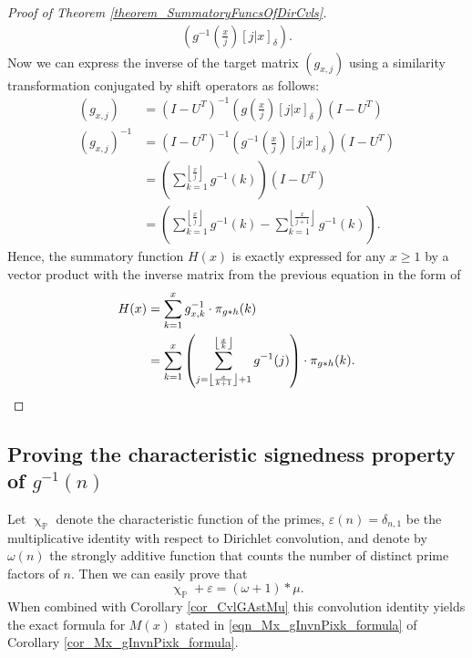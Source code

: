 \documentclass[11pt,reqno,a4letter]{article}
\numberwithin{figure}{section}
\numberwithin{table}{section}
\newcommand{\Iverson}[1]{\ensuremath{\left[#1\right]_{\delta}}}
\newcommand{\floor}[1]{\left\lfloor #1 \right\rfloor}
\renewcommand{\chi}{\upchi}
\theoremstyle{plain}
\numberwithin{theorem}{section}
\theoremstyle{definition}
\begin{document}
\begin{proof}[Proof of Theorem \ref{theorem_SummatoryFuncsOfDirCvls}]
\begin{align*}
     \left(g^{-1}\left(\frac{x}{j}\right) \Iverson{j|x}\right). 
\end{align*} 
Now we can express the inverse of the target matrix $(g_{x,j})$ 
using a similarity transformation conjugated by shift operators as follows: 
\begin{align*} 
(g_{x,j}) & = (I-U^{T})^{-1} \left(g\left(\frac{x}{j}\right) \Iverson{j|x}\right) (I-U^{T}) \\ 
(g_{x,j})^{-1} & = (I-U^{T})^{-1} \left(g^{-1}\left(\frac{x}{j}\right) \Iverson{j|x}\right) (I-U^{T}) \\ 
     & = \left(\sum_{k=1}^{\floor{\frac{x}{j}}} g^{-1}(k)\right) (I-U^{T}) \\ 
     & = \left(\sum_{k=1}^{\floor{\frac{x}{j}}} g^{-1}(k) - \sum_{k=1}^{\floor{\frac{x}{j+1}}} g^{-1}(k)\right). 
\end{align*} 
Hence, the summatory function $H(x)$ is exactly expressed for any $x \geq 1$ 
by a vector product with the inverse matrix from the previous equation in the form of 
\begin{align*} 
H(x) & = \sum_{k=1}^x g_{x,k}^{-1} \cdot \pi_{g \ast h}(k) \\ 
     & = \sum_{k=1}^x \left(\sum_{j=\floor{\frac{x}{k+1}}+1}^{\floor{\frac{x}{k}}} g^{-1}(j)\right) \cdot \pi_{g \ast h}(k). 
     \qedhere
\end{align*} 
\end{proof} 

\subsection{Proving the characteristic signedness property of $g^{-1}(n)$} 

Let $\chi_{\mathbb{P}}$ denote the characteristic function of the primes, 
$\varepsilon(n) = \delta_{n,1}$ be the multiplicative identity with respect to Dirichlet convolution, 
and denote by $\omega(n)$ the strongly additive function that counts the number of 
distinct prime factors of $n$. Then we can easily prove that 
\begin{equation}
\label{eqn_AntiqueDivisorSumIdent} 
\chi_{\mathbb{P}} + \varepsilon = (\omega + 1) \ast \mu. 
\end{equation} 
When combined with Corollary \ref{cor_CvlGAstMu} 
this convolution identity yields the exact 
formula for $M(x)$ stated in \eqref{eqn_Mx_gInvnPixk_formula} of 
Corollary \ref{cor_Mx_gInvnPixk_formula}. 
\end{document}
